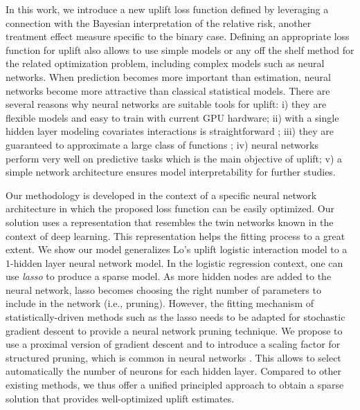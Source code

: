 \documentclass{article}
\begin{document}
In this work, we introduce a new uplift loss function defined by leveraging a connection with the Bayesian interpretation of the relative risk, another treatment effect measure specific to the binary case. Defining an appropriate loss function for uplift also allows to use simple models or any off the shelf method for the related optimization problem, including complex models such as neural networks. When prediction becomes more important than estimation, neural networks become more attractive than classical statistical models. There are several reasons why neural networks are suitable tools for uplift: i) they are flexible models and easy to train with current GPU hardware; ii) with a single hidden layer modeling covariates interactions is straightforward \citep{tsang2018neural}; iii) they are guaranteed to approximate a large class of  functions \citep{cybenko1989approximation, hornik1991approximation, pinkus1999approximation}; iv) neural networks perform very well on predictive tasks which is the main objective of uplift; v) a simple network architecture ensures model interpretability for further studies.

Our methodology is developed in the context of a specific neural network architecture in which the proposed loss function can be easily optimized. Our solution uses a representation that resembles the twin networks \citep{bromley1994signature} known in the context of deep learning. This representation helps the fitting process to a great extent. We show our model generalizes Lo's uplift logistic interaction model to a $1$-hidden layer neural network model. In the logistic regression context, one can use \emph{lasso} \citep{Tibshirani_lasso_1996} to produce a sparse model. As more hidden nodes are added to the neural network, lasso becomes choosing the right number of parameters to include in the network (i.e., pruning). However, the fitting mechanism of statistically-driven methods such as the lasso needs to be adapted for stochastic gradient descent to provide a neural network pruning technique. %
We propose to use a proximal version of gradient descent and to introduce a scaling factor for structured pruning, which is common in neural networks \citep{ramakrishnan2020differentiable}. This allows to select automatically the number of neurons for each hidden layer. Compared to other existing methods, we thus offer a unified principled approach to obtain a sparse solution that provides well-optimized uplift estimates.
\end{document}
